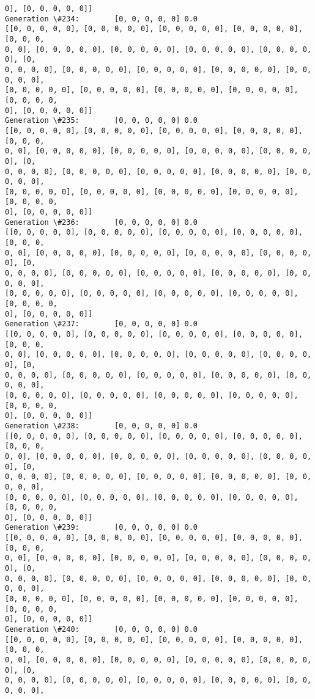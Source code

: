 \documentclass[11pt]{article}
\begin{document}
\begin{Verbatim}[commandchars=\\\{\}]
0], [0, 0, 0, 0, 0]]
Generation \#234:        [0, 0, 0, 0, 0] 0.0
[[0, 0, 0, 0, 0], [0, 0, 0, 0, 0], [0, 0, 0, 0, 0], [0, 0, 0, 0, 0], [0, 0, 0,
0, 0], [0, 0, 0, 0, 0], [0, 0, 0, 0, 0], [0, 0, 0, 0, 0], [0, 0, 0, 0, 0], [0,
0, 0, 0, 0], [0, 0, 0, 0, 0], [0, 0, 0, 0, 0], [0, 0, 0, 0, 0], [0, 0, 0, 0, 0],
[0, 0, 0, 0, 0], [0, 0, 0, 0, 0], [0, 0, 0, 0, 0], [0, 0, 0, 0, 0], [0, 0, 0, 0,
0], [0, 0, 0, 0, 0]]
Generation \#235:        [0, 0, 0, 0, 0] 0.0
[[0, 0, 0, 0, 0], [0, 0, 0, 0, 0], [0, 0, 0, 0, 0], [0, 0, 0, 0, 0], [0, 0, 0,
0, 0], [0, 0, 0, 0, 0], [0, 0, 0, 0, 0], [0, 0, 0, 0, 0], [0, 0, 0, 0, 0], [0,
0, 0, 0, 0], [0, 0, 0, 0, 0], [0, 0, 0, 0, 0], [0, 0, 0, 0, 0], [0, 0, 0, 0, 0],
[0, 0, 0, 0, 0], [0, 0, 0, 0, 0], [0, 0, 0, 0, 0], [0, 0, 0, 0, 0], [0, 0, 0, 0,
0], [0, 0, 0, 0, 0]]
Generation \#236:        [0, 0, 0, 0, 0] 0.0
[[0, 0, 0, 0, 0], [0, 0, 0, 0, 0], [0, 0, 0, 0, 0], [0, 0, 0, 0, 0], [0, 0, 0,
0, 0], [0, 0, 0, 0, 0], [0, 0, 0, 0, 0], [0, 0, 0, 0, 0], [0, 0, 0, 0, 0], [0,
0, 0, 0, 0], [0, 0, 0, 0, 0], [0, 0, 0, 0, 0], [0, 0, 0, 0, 0], [0, 0, 0, 0, 0],
[0, 0, 0, 0, 0], [0, 0, 0, 0, 0], [0, 0, 0, 0, 0], [0, 0, 0, 0, 0], [0, 0, 0, 0,
0], [0, 0, 0, 0, 0]]
Generation \#237:        [0, 0, 0, 0, 0] 0.0
[[0, 0, 0, 0, 0], [0, 0, 0, 0, 0], [0, 0, 0, 0, 0], [0, 0, 0, 0, 0], [0, 0, 0,
0, 0], [0, 0, 0, 0, 0], [0, 0, 0, 0, 0], [0, 0, 0, 0, 0], [0, 0, 0, 0, 0], [0,
0, 0, 0, 0], [0, 0, 0, 0, 0], [0, 0, 0, 0, 0], [0, 0, 0, 0, 0], [0, 0, 0, 0, 0],
[0, 0, 0, 0, 0], [0, 0, 0, 0, 0], [0, 0, 0, 0, 0], [0, 0, 0, 0, 0], [0, 0, 0, 0,
0], [0, 0, 0, 0, 0]]
Generation \#238:        [0, 0, 0, 0, 0] 0.0
[[0, 0, 0, 0, 0], [0, 0, 0, 0, 0], [0, 0, 0, 0, 0], [0, 0, 0, 0, 0], [0, 0, 0,
0, 0], [0, 0, 0, 0, 0], [0, 0, 0, 0, 0], [0, 0, 0, 0, 0], [0, 0, 0, 0, 0], [0,
0, 0, 0, 0], [0, 0, 0, 0, 0], [0, 0, 0, 0, 0], [0, 0, 0, 0, 0], [0, 0, 0, 0, 0],
[0, 0, 0, 0, 0], [0, 0, 0, 0, 0], [0, 0, 0, 0, 0], [0, 0, 0, 0, 0], [0, 0, 0, 0,
0], [0, 0, 0, 0, 0]]
Generation \#239:        [0, 0, 0, 0, 0] 0.0
[[0, 0, 0, 0, 0], [0, 0, 0, 0, 0], [0, 0, 0, 0, 0], [0, 0, 0, 0, 0], [0, 0, 0,
0, 0], [0, 0, 0, 0, 0], [0, 0, 0, 0, 0], [0, 0, 0, 0, 0], [0, 0, 0, 0, 0], [0,
0, 0, 0, 0], [0, 0, 0, 0, 0], [0, 0, 0, 0, 0], [0, 0, 0, 0, 0], [0, 0, 0, 0, 0],
[0, 0, 0, 0, 0], [0, 0, 0, 0, 0], [0, 0, 0, 0, 0], [0, 0, 0, 0, 0], [0, 0, 0, 0,
0], [0, 0, 0, 0, 0]]
Generation \#240:        [0, 0, 0, 0, 0] 0.0
[[0, 0, 0, 0, 0], [0, 0, 0, 0, 0], [0, 0, 0, 0, 0], [0, 0, 0, 0, 0], [0, 0, 0,
0, 0], [0, 0, 0, 0, 0], [0, 0, 0, 0, 0], [0, 0, 0, 0, 0], [0, 0, 0, 0, 0], [0,
0, 0, 0, 0], [0, 0, 0, 0, 0], [0, 0, 0, 0, 0], [0, 0, 0, 0, 0], [0, 0, 0, 0, 0],

\end{Verbatim}
\end{document}

